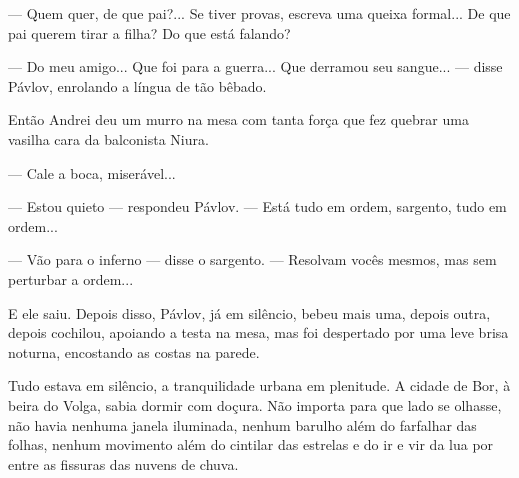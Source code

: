 --- Quem quer, de que pai?... Se tiver provas, escreva uma queixa
formal... De que pai querem tirar a filha? Do que está falando?

--- Do meu amigo... Que foi para a guerra... Que derramou seu sangue...
--- disse Pávlov, enrolando a língua de tão bêbado.

Então Andrei deu um murro na mesa com tanta força que fez quebrar uma
vasilha cara da balconista Niura.

--- Cale a boca, miserável...

--- Estou quieto --- respondeu Pávlov. --- Está tudo em ordem, sargento,
tudo em ordem...

--- Vão para o inferno --- disse o sargento. --- Resolvam vocês mesmos,
mas sem perturbar a ordem...

E ele saiu. Depois disso, Pávlov, já em silêncio, bebeu mais uma, depois
outra, depois cochilou, apoiando a testa na mesa, mas foi despertado por
uma leve brisa noturna, encostando as costas na parede.

Tudo estava em silêncio, a tranquilidade urbana em plenitude. A cidade
de Bor, à beira do Volga, sabia dormir com doçura. Não importa para que
lado se olhasse, não havia nenhuma janela iluminada, nenhum barulho além
do farfalhar das folhas, nenhum movimento além do cintilar das estrelas
e do ir e vir da lua por entre as fissuras das nuvens de chuva.

